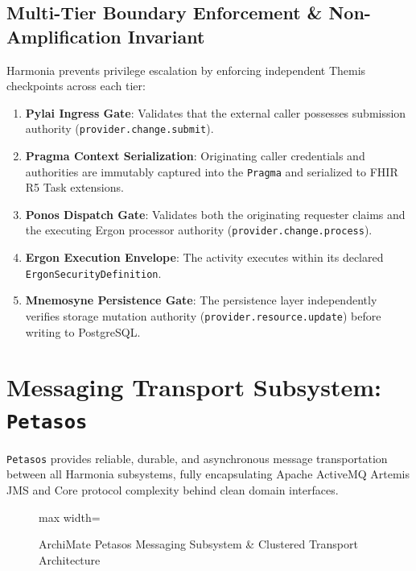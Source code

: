 \subsection{Multi-Tier Boundary Enforcement \& Non-Amplification Invariant}
Harmonia prevents privilege escalation by enforcing independent Themis checkpoints across each tier:
\begin{enumerate}
    \item \textbf{Pylai Ingress Gate}: Validates that the external caller possesses submission authority (\texttt{provider.change.submit}).
    \item \textbf{Pragma Context Serialization}: Originating caller credentials and authorities are immutably captured into the \texttt{Pragma} and serialized to FHIR R5 Task extensions.
    \item \textbf{Ponos Dispatch Gate}: Validates both the originating requester claims and the executing Ergon processor authority (\texttt{provider.change.process}).
    \item \textbf{Ergon Execution Envelope}: The activity executes within its declared \texttt{ErgonSecurityDefinition}.
    \item \textbf{Mnemosyne Persistence Gate}: The persistence layer independently verifies storage mutation authority (\texttt{provider.resource.update}) before writing to PostgreSQL.
\end{enumerate}

\section{Messaging Transport Subsystem: \texttt{Petasos}}

\texttt{Petasos} provides reliable, durable, and asynchronous message transportation between all Harmonia subsystems, fully encapsulating Apache ActiveMQ Artemis JMS and Core protocol complexity behind clean domain interfaces.

\begin{figure}[htbp]
    \centering
    \begin{adjustbox}{max width=\textwidth}
        
    \end{adjustbox}
    \caption{ArchiMate Petasos Messaging Subsystem \& Clustered Transport Architecture}
    \label{fig:app_layer_petasos_messaging}
\end{figure}

